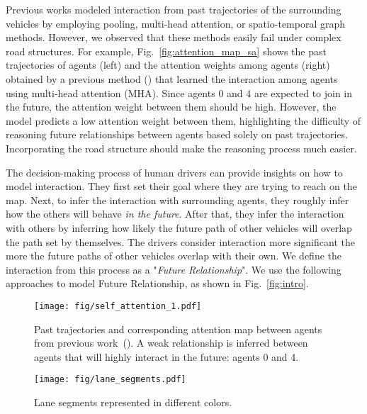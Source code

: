 \documentclass{article} \usepackage{iclr2023_conference,times}
\begin{document}
Previous works modeled interaction from past trajectories of the surrounding vehicles by employing pooling, multi-head attention, or spatio-temporal graph methods.
However, we observed that these methods easily fail under complex road structures. 
For example, Fig.~\ref{fig:attention_map_sa} shows the past trajectories of agents (left) and the attention weights among agents (right) obtained by a previous method (\cite{mercat2020multi}) that learned the interaction among agents using multi-head attention (MHA).
Since agents 0 and 4 are expected to join in the future, the attention weight between them should be high. 
However, the model predicts a low attention weight between them, highlighting the difficulty of reasoning future relationships between agents based solely on past trajectories. 
Incorporating the road structure should make the reasoning process much easier.

The decision-making process of human drivers can provide insights on how to model interaction.
They first set their goal where they are trying to reach on the map.
Next, to infer the interaction with surrounding agents, they roughly infer how the others will behave \textit{in the future}.
After that, they infer the interaction with others by inferring how likely the future path of other vehicles will overlap the path set by themselves.
The drivers consider interaction more significant the more the future paths of other vehicles overlap with their own.
We define the interaction from this process as a "\textit{Future Relationship}".
We use the following approaches to model Future Relationship, as shown in Fig.~\ref{fig:intro}.

\begin{figure}
\centering
\vspace{-10pt}
\begin{minipage}{.55\textwidth}
  \centering
  \texttt{[image: fig/self\_attention\_1.pdf]}
  \vspace{-10pt}
  \caption{Past trajectories and corresponding attention map between agents from previous work~(\cite{mercat2020multi}). A weak relationship is inferred between agents that will highly interact in the future: agents 0 and 4.}
  \label{fig:attention_map_sa}
\end{minipage}
\hspace{1cm}
\begin{minipage}{0.25\textwidth}
  \centering
  \vspace{8pt}
  \texttt{[image: fig/lane\_segments.pdf]}
  \caption{Lane segments represented in different colors.}
  \label{fig:lane_segment}
\end{minipage}\vspace{-5pt}
\end{figure}
\end{document}
